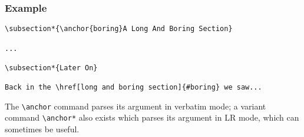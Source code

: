 \subsubsection*{Example}

\begin{verbatim}
\subsection*{\anchor{boring}A Long And Boring Section}

...

\subsection*{Later On}

Back in the \href[long and boring section]{#boring} we saw...
\end{verbatim}

The \verb|\anchor| command parses its argument in verbatim mode; a variant
command \verb|\anchor*| also exists which parses its argument in LR mode,
which can sometimes be useful.
